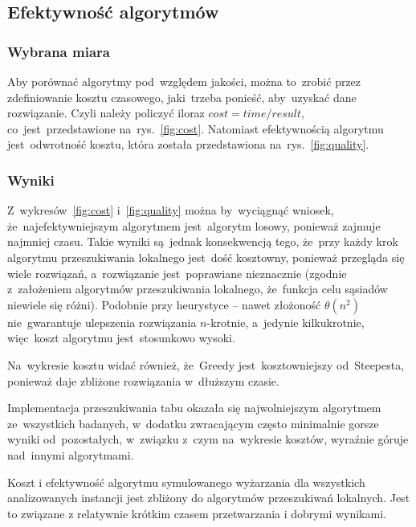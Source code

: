\subsection{Efektywność algorytmów}

\subsubsection{Wybrana miara}

Aby porównać algorytmy pod~względem jakości, można to~zrobić przez zdefiniowanie kosztu czasowego, jaki~trzeba ponieść, aby~uzyskać dane rozwiązanie. Czyli należy policzyć iloraz $cost = time / result$, co~jest~przedstawione na~rys.~\ref{fig:cost}. Natomiast efektywnością algorytmu jest~odwrotność kosztu, która została przedstawiona na~rys.~\ref{fig:quality}.

\subsubsection{Wyniki}

Z~wykresów~\ref{fig:cost} i~\ref{fig:quality} można by~wyciągnąć wniosek, że~najefektywniejszym algorytmem jest~algorytm losowy, ponieważ zajmuje najmniej czasu. Takie wyniki są~jednak konsekwencją tego, że~przy każdy krok algorytmu przeszukiwania lokalnego jest~dość kosztowny, ponieważ przegląda się wiele rozwiązań, a~rozwiązanie jest~poprawiane nieznacznie (zgodnie z~założeniem algorytmów przeszukiwania lokalnego, że~funkcja celu sąsiadów niewiele się różni). Podobnie przy heurystyce -- nawet złożoność $\theta(n^2)$ nie~gwarantuje ulepszenia rozwiązania $n$-krotnie, a~jedynie kilkukrotnie, więc~koszt algorytmu jest~stosunkowo wysoki.

Na~wykresie kosztu widać również, że~Greedy jest~kosztowniejszy od~Steepesta, ponieważ daje zbliżone rozwiązania w~dłuższym czasie.

{\color{part2}
Implementacja przeszukiwania tabu okazała się najwolniejszym algorytmem ze~wszystkich badanych, w~dodatku zwracającym często minimalnie gorsze wyniki od~pozostałych, w~związku z~czym na~wykresie kosztów, wyraźnie góruje nad~innymi algorytmami.

Koszt i efektywność algorytmu symulowanego wyżarzania dla wszystkich analizowanych instancji jest zbliżony do algorytmów przeszukiwań lokalnych. Jest to związane z relatywnie krótkim czasem przetwarzania i dobrymi wynikami.

}

